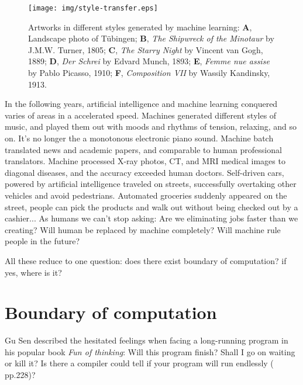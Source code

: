 \documentclass{article}
\begin{document}
\begin{figure}[htbp]
 \centering
 \texttt{[image: img/style-transfer.eps]}
 \caption{Artworks in different styles generated by machine learning: \textbf{A}, Landscape photo of Tübingen; \textbf{B}, {\em The Shipwreck of the Minotaur} by J.M.W. Turner, 1805; \textbf{C}, {\em The Starry Night} by Vincent van Gogh, 1889; \textbf{D}, {\em Der Schrei} by Edvard Munch, 1893; \textbf{E}, {\em Femme nue assise} by Pablo Picasso, 1910; \textbf{F}, {\em Composition VII} by Wassily Kandinsky, 1913.}
 \label{fig:style-transfer}
\end{figure}

In the following years, artificial intelligence and machine learning conquered varies of areas in a accelerated speed. Machines generated different styles of music, and played them out with moods and rhythms of tension, relaxing, and so on. It's no longer the a monotonous electronic piano sound. Machine batch translated news and academic papers, and comparable to human professional translators. Machine processed X-ray photos, CT, and MRI medical images to diagonal diseases, and the accuracy exceeded human doctors. Self-driven cars, powered by artificial intelligence traveled on streets, successfully overtaking other vehicles and avoid pedestrians. Automated groceries suddenly appeared on the street, people can pick the products and walk out without being checked out by a cashier... As humans we can't stop asking: Are we eliminating jobs faster than we creating? Will human be replaced by machine completely? Will machine rule people in the future?

All these reduce to one question: does there exist boundary of computation? if yes, where is it?

\section{Boundary of computation}

Gu Sen described the hesitated feelings when facing a long-running program in his popular book {\em Fun of thinking}: Will this program finish? Shall I go on waiting or kill it? Is there a compiler could tell if your program will run endlessly (\cite{GuSen-2012} pp.228)?
\end{document}
